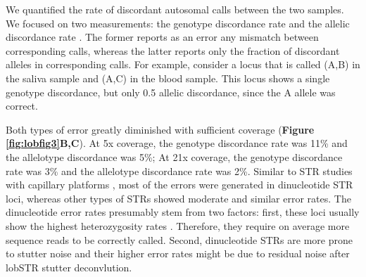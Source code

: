 We quantified the rate of discordant autosomal calls between the two samples. We focused on two measurements: the genotype discordance rate and the allelic discordance rate \cite{PompanonBoninBellemainEtAl2005}. The former reports as an error any mismatch between corresponding calls, whereas the latter reports only the fraction of discordant alleles in corresponding calls. For example, consider a locus that is called (A,B) in the saliva sample and (A,C) in the blood sample. This locus shows a single genotype discordance, but only 0.5 allelic discordance, since the A allele was correct. 

Both types of error greatly diminished with sufficient coverage (\textbf{Figure \ref{fig:lobfig3}B,C}). At 5x coverage, the genotype discordance rate was 11\% and the allelotype discordance was 5\%; At 21x coverage, the genotype discordance rate was 3\% and the allelotype discordance rate was 2\%. Similar to STR studies with capillary platforms \cite{WeberBroman2001}, most of the errors were generated in dinucleotide STR loci, whereas other types of STRs showed moderate and similar error rates. The dinucleotide error rates presumably stem from two factors: first, these loci usually show the highest heterozygosity rates \cite{ChakrabortyKimmelStiversEtAl1997,BrinkmannKlintscharNeuhuberEtAl1998,PembertonSandefurJakobssonEtAl2009}. Therefore, they require on average more sequence reads to be correctly called. Second, dinucleotide STRs are more prone to stutter noise \cite{Ellegren2004} and their higher error rates might be due to residual noise after lobSTR stutter deconvlution.

